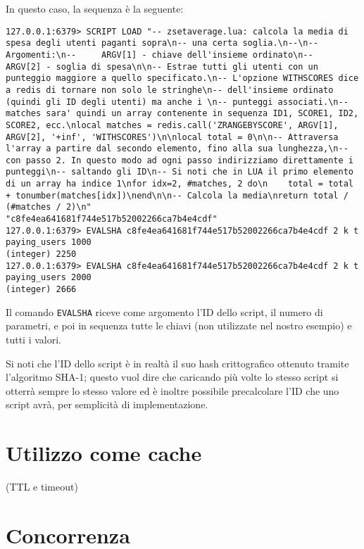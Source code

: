 In questo caso, la sequenza è la seguente:

\medskip
\begin{lstlisting}
127.0.0.1:6379> SCRIPT LOAD "-- zsetaverage.lua: calcola la media di spesa degli utenti paganti sopra\n-- una certa soglia.\n--\n-- Argomenti:\n--     ARGV[1] - chiave dell'insieme ordinato\n--     ARGV[2] - soglia di spesa\n\n-- Estrae tutti gli utenti con un punteggio maggiore a quello specificato.\n-- L'opzione WITHSCORES dice a redis di tornare non solo le stringhe\n-- dell'insieme ordinato (quindi gli ID degli utenti) ma anche i \n-- punteggi associati.\n-- matches sara' quindi un array contenente in sequenza ID1, SCORE1, ID2, SCORE2, ecc.\nlocal matches = redis.call('ZRANGEBYSCORE', ARGV[1], ARGV[2], '+inf', 'WITHSCORES')\n\nlocal total = 0\n\n-- Attraversa l'array a partire dal secondo elemento, fino alla sua lunghezza,\n-- con passo 2. In questo modo ad ogni passo indirizziamo direttamente i punteggi\n-- saltando gli ID\n-- Si noti che in LUA il primo elemento di un array ha indice 1\nfor idx=2, #matches, 2 do\n    total = total + tonumber(matches[idx])\nend\n\n-- Calcola la media\nreturn total / (#matches / 2)\n"
"c8fe4ea641681f744e517b52002266ca7b4e4cdf"
127.0.0.1:6379> EVALSHA c8fe4ea641681f744e517b52002266ca7b4e4cdf 2 k t paying_users 1000
(integer) 2250
127.0.0.1:6379> EVALSHA c8fe4ea641681f744e517b52002266ca7b4e4cdf 2 k t paying_users 2000
(integer) 2666
\end{lstlisting}

Il comando \verb|EVALSHA| riceve come argomento l'ID dello script, il numero di parametri, e poi
in sequenza tutte le chiavi (non utilizzate nel nostro esempio) e tutti i valori. 

Si noti che l'ID dello script è in realtà il suo hash crittografico ottenuto tramite l'algoritmo
SHA-1; questo vuol dire che caricando più volte lo stesso script si otterrà sempre lo stesso valore
ed è inoltre possibile precalcolare l'ID che uno script avrà, per semplicità di implementazione.

\section{Utilizzo come cache}

(TTL e timeout)




\section{Concorrenza}

